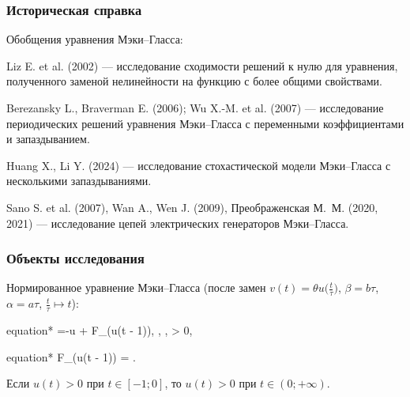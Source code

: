 \begin{frame}
	\frametitle{Историческая справка}
	
	Обобщения уравнения Мэки--Гласса:
	
	\smallskip
	
	Liz E. et al. (2002) --- исследование сходимости решений к нулю для уравнения, полученного заменой нелинейности на функцию с более общими свойствами.
	
	\smallskip
	
	Berezansky L., Braverman E. (2006); Wu X.-M. et al. (2007) --- исследование периодических решений уравнения Мэки--Гласса с переменными коэффициентами и запаздыванием.
	
	\smallskip
	
	Huang X., Li Y. (2024) --- исследование стохастической модели Мэки--Гласса с несколькими запаздываниями.
	
	\smallskip
	
	Sano S. et al. (2007), Wan A., Wen J. (2009), Преображенская М.~М. (2020, 2021) --- исследование цепей электрических генераторов Мэки--Гласса.
\end{frame}

\begin{frame}
	\frametitle{Объекты исследования}
	
	Нормированное уравнение Мэки--Гласса (после замен $v(t) = \theta u\Big(\frac{t}{\tau}\Big)$, $\beta = b\tau$, $\alpha=a\tau$, $\frac{t}{\tau} \mapsto t$):
	
	\begin{empheq}[box=\myeq]{equation*}
		=-\beta u + \alpha F_\gamma(u(t - 1)), 
		\quad \alpha, \beta, \gamma > 0,
	\end{empheq}
	
	\begin{empheq}[box=\myeq]{equation*}
	 F_\gamma(u(t - 1)) = .
	\end{empheq}
	
	\bigskip
	
	Если $u(t) > 0$ при $t \in [-1; 0]$, то $u(t) > 0$ при $t \in (0; + \infty)$.
	
%	
%	
\end{frame}

